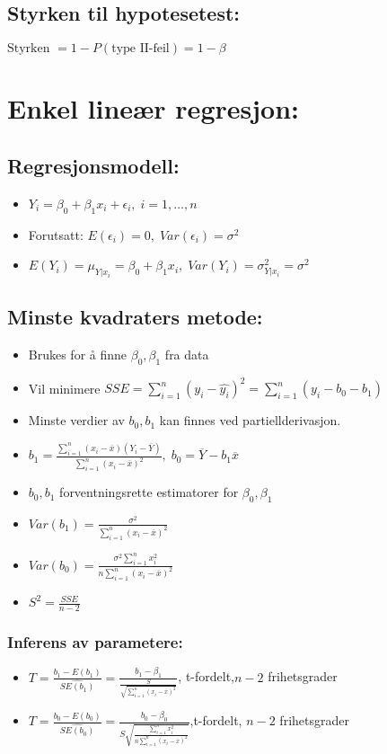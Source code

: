 \documentclass[12pt,a4paper,twocolumn,twoside]{article}
\begin{document}
\subsection*{Styrken til hypotesetest:}
$\text{Styrken }=1-P(\text{type II-feil})=1-\beta$
%
%
\section*{Enkel lineær regresjon:}
\subsection*{Regresjonsmodell:}
\begin{itemize}[topsep=0pt,itemsep=0pt, partopsep=0pt]
    \item $Y_i=\beta_0+\beta_1x_i+\epsilon_i,\;i=1,\dots,n$
    \item Forutsatt: $E(\epsilon_i) = 0,\;Var(\epsilon_i)=\sigma^2$
    \item $E(Y_i)=\mu_{Y|x_i}=\beta_0+\beta_1x_i,\;Var(Y_i)=\sigma^2_{Y|x_i}=\sigma^2$
\end{itemize}
\subsection*{Minste kvadraters metode:}
\begin{itemize}[topsep=0pt,itemsep=0pt, partopsep=0pt]
    \item Brukes for å finne $\beta_0,\beta_1$ fra data
    \item Vil minimere $SSE=\sum_{i=1}^n(y_i-\hat{y_i})^2=\sum_{i=1}^n(y_i-b_0-b_1)$
    \item Minste verdier av $b_0,b_1$ kan finnes ved partiellderivasjon.
    \item $b_1=\frac{\sum_{i=1}^n(x_i-\overline{x})(Y_i-\overline{Y})}{\sum_{i=1}^n(x_i-\overline{x})^2},\; b_0=\overline{Y}-b_1\overline{x}$
    \item $b_0, b_1$ forventningsrette estimatorer for $\beta_0,\beta_1$
    \item $Var(b_1)=\frac{\sigma^2}{\sum_{i=1}^n (x_i-\overline{x})^2}$
    \item $Var(b_0)=\frac{\sigma^2\sum_{i=1}^nx_i^2}{n\sum_{i=1}^n(x_i-\overline{x})^2}$
    \item $S^2=\frac{SSE}{n-2}$
\end{itemize}
\subsubsection*{Inferens av parametere:}
\begin{itemize}[topsep=0pt,itemsep=0pt, partopsep=0pt]
    \item $T=\frac{b_1-E(b_1)}{\hat{SE(b_1)}}=\frac{b_1-\beta_1}{\frac{S}{\sqrt{\sum_{i=1}^n(x_i-\overline{x})^2}}}$, t-fordelt,$n-2$ frihetsgrader
    \item $T=\frac{b_0-E(b_0)}{\hat{SE(b_0)}}=\frac{b_0-\beta_0}{S\sqrt{\frac{\sum_{i=1}^nx^2_i}{n\sum_{i=1}^n(x_i-\overline{x})^2}}}$,t-fordelt, $n-2$ frihetsgrader
\end{itemize}
\end{document}
